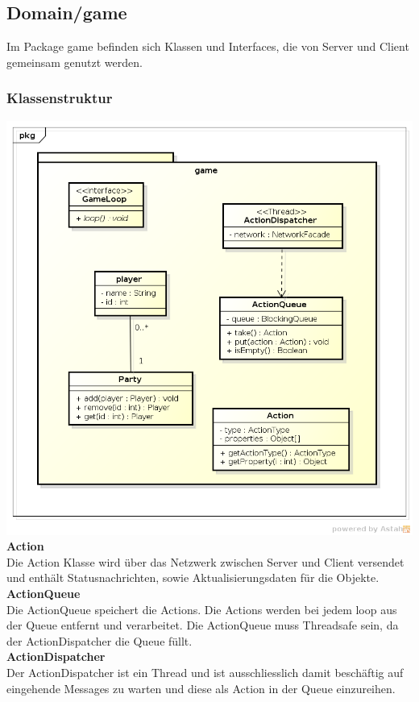 \documentclass[11pt]{scrartcl}
\begin{document}
\newpage

\subsection{Domain/game}
Im Package game befinden sich Klassen und Interfaces, die von Server und Client gemeinsam genutzt werden.
\subsubsection{Klassenstruktur}
\includegraphics[scale=0.75]{ClassDiagramGame}
\newpage
\textbf{Action}\\
Die Action Klasse wird über das Netzwerk zwischen Server und Client versendet und enthält Statusnachrichten, sowie Aktualisierungsdaten für die Objekte.\\

\textbf{ActionQueue}\\
Die ActionQueue speichert die Actions. Die Actions werden bei jedem loop aus der Queue entfernt und verarbeitet. Die ActionQueue muss Threadsafe sein, da der ActionDispatcher die Queue füllt.\\

\textbf{ActionDispatcher}\\
Der ActionDispatcher ist ein Thread und ist ausschliesslich damit beschäftig auf eingehende Messages zu warten und diese als Action in der Queue einzureihen.\\
\end{document}
